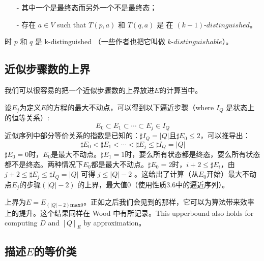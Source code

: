 
\begin{itemize}
    \item [-] 其中一个是最终态而另外一个不是最终态；
    \item [-] 存在 $a\in V$ such that $T(p,a)$ 和 $T(q,a)$ 是 在 $(k-1)$-$distinguished$。
\end{itemize}
时 $p$ 和 $q$ 是 k-distinguished （一些作者也把它叫做 $k$-$distinguishable$）。



\subsection{近似步骤数的上界}
我们可以很容易的把一个近似步骤数的上界放进$E$的计算当中。

设$E_j$为定义$E$的方程的最大不动点，可以得到以下逼近步骤（where $I_Q$ 是状态上的恒等关系）:
$$ E_0 \subset E_1 \subset \cdots \subset E_j \in I_Q $$
近似序列中部分等价关系的指数是已知的：$\sharp I_Q = |Q| \mbox{且} \sharp E_0 \leq 2$，可以推导出：
$$ \sharp E_0 < \sharp E_1 < \cdots < \sharp E_j \leq \sharp I_Q = |Q| $$
$\sharp E_0=0$时，$E_0$是最大不动点。$\sharp E_1=1$时，要么所有状态都是终态，要么所有状态都不是终态。两种情况下$E_0$都是最大不动点。$\sharp E_0=2$时，$i+2 \leq \sharp E_i$，由 $ j+2 \leq \sharp E_j \leq \sharp I_Q = |Q| $ 可得 $j \leq |Q|-2 $ 。这给出了计算（从$E_0$开始）最大不动点$E_j$的步骤$(|Q|-2)$ 的上界，最大值0（使用性质3.6中的逼近序列）。

上界为$E=E_{(|Q|-2)\textbf{max} 0}$。正如之后我们会见到的那样，它可以为算法带来效率上的提升。这个结果同样在 Wood \cite[引理  2.4.1]{Wood87} 中有所记录。This upperbound also holds for computing $D$ and $[Q]_E$ by approximation。


\subsection{描述$E$的等价类}

